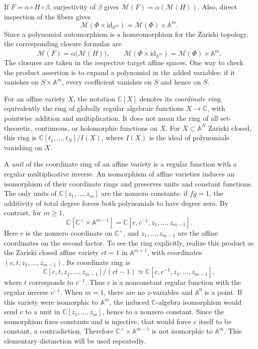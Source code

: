 \documentclass[11pt]{article}
\numberwithin{equation}{section}
\theoremstyle{plain}
\theoremstyle{definition}
\theoremstyle{remark}
\newcommand{\C}{\mathbb{C}}
\newcommand{\A}{\mathbb{A}}
\newcommand{\id}{\mathrm{id}}
\newcommand{\Miss}{\mathcal M}
\begin{document}
If $F=\alpha\circ H\circ\beta$, surjectivity of $\beta$ gives
$\Miss(F)=\alpha(\Miss(H))$. Also, direct inspection of the fibers gives
\begin{equation}\label{prod:eq:missing-product}
 \Miss(\Phi\times\id_{\A^m})=\Miss(\Phi)\times\A^m.
\end{equation}
Since a polynomial automorphism is a homeomorphism for the Zariski
topology, the corresponding closure formulas are
\[
 \overline{\Miss(F)}=\alpha\bigl(\overline{\Miss(H)}\bigr),\qquad
 \overline{\Miss(\Phi\times\id_{\A^m})}
 =\overline{\Miss(\Phi)}\times\A^m.
\]
The closures are taken in the respective target affine spaces.
One way to check the product assertion is to expand a polynomial in the added variables:
if it vanishes on $S\times\A^m$, every coefficient vanishes on $S$ and
hence on $\overline S$.

For an affine variety $X$, the notation $\C[X]$ denotes its
\emph{coordinate ring}, equivalently the ring of globally regular
algebraic functions $X\to\C$, with pointwise addition and multiplication.
It does not mean the ring of all set-theoretic, continuous, or holomorphic
functions on $X$. For $X\subset\A^N$ Zariski closed, this ring is
$\C[t_1,\ldots,t_N]/I(X)$, where $I(X)$ is the ideal of polynomials
vanishing on $X$.

A \emph{unit} of the coordinate ring of an affine variety is a regular
function with a regular multiplicative inverse. An isomorphism of affine
varieties induces an isomorphism of their coordinate rings and preserves
units and constant functions. The only units of
$\C[z_1,\ldots,z_m]$ are the nonzero constants: if $fg=1$, the additivity
of total degree forces both polynomials to have degree zero. By contrast, for $m\geq1$,
\[
 \C[\C^\times\times\A^{m-1}]
 =\C[c,c^{-1},z_1,\ldots,z_{m-1}].
\]
Here $c$ is the nonzero coordinate on $\C^\times$, and $z_1,\ldots,z_{m-1}$
are the affine coordinates on the second factor. To see the ring explicitly,
realize this product as the Zariski closed affine variety $ct=1$ in
$\A^{m+1}$, with coordinates $(c,t,z_1,\ldots,z_{m-1})$. Its coordinate
ring is
\[
 \C[c,t,z_1,\ldots,z_{m-1}]/(ct-1)
 \simeq\C[c,c^{-1},z_1,\ldots,z_{m-1}],
\]
where $t$ corresponds to $c^{-1}$. Thus $c$ is a nonconstant regular
function with the regular inverse $c^{-1}$. When $m=1$, there are no
$z$-variables and $\A^0$ is a point.
If this variety were isomorphic to $\A^m$, the induced $\C$-algebra
isomorphism would send $c$ to a unit in $\C[z_1,\ldots,z_m]$, hence
to a nonzero constant. Since the isomorphism fixes constants and is
injective, that would force $c$ itself to be constant, a contradiction.
Therefore $\C^\times\times\A^{m-1}$ is not isomorphic to $\A^m$.
This elementary distinction will be used repeatedly.
\end{document}
